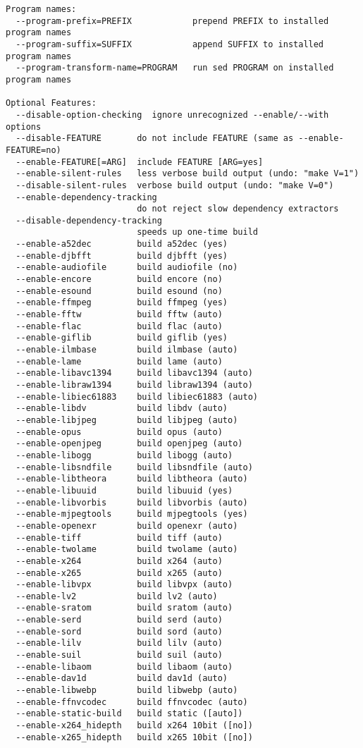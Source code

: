 \begin{verbatim}
Program names:
  --program-prefix=PREFIX            prepend PREFIX to installed program names
  --program-suffix=SUFFIX            append SUFFIX to installed program names
  --program-transform-name=PROGRAM   run sed PROGRAM on installed program names

Optional Features:
  --disable-option-checking  ignore unrecognized --enable/--with options
  --disable-FEATURE       do not include FEATURE (same as --enable-FEATURE=no)
  --enable-FEATURE[=ARG]  include FEATURE [ARG=yes]
  --enable-silent-rules   less verbose build output (undo: "make V=1")
  --disable-silent-rules  verbose build output (undo: "make V=0")
  --enable-dependency-tracking
                          do not reject slow dependency extractors
  --disable-dependency-tracking
                          speeds up one-time build
  --enable-a52dec         build a52dec (yes)
  --enable-djbfft         build djbfft (yes)
  --enable-audiofile      build audiofile (no)
  --enable-encore         build encore (no)
  --enable-esound         build esound (no)
  --enable-ffmpeg         build ffmpeg (yes)
  --enable-fftw           build fftw (auto)
  --enable-flac           build flac (auto)
  --enable-giflib         build giflib (yes)
  --enable-ilmbase        build ilmbase (auto)
  --enable-lame           build lame (auto)
  --enable-libavc1394     build libavc1394 (auto)
  --enable-libraw1394     build libraw1394 (auto)
  --enable-libiec61883    build libiec61883 (auto)
  --enable-libdv          build libdv (auto)
  --enable-libjpeg        build libjpeg (auto)
  --enable-opus           build opus (auto)
  --enable-openjpeg       build openjpeg (auto)
  --enable-libogg         build libogg (auto)
  --enable-libsndfile     build libsndfile (auto)
  --enable-libtheora      build libtheora (auto)
  --enable-libuuid        build libuuid (yes)
  --enable-libvorbis      build libvorbis (auto)
  --enable-mjpegtools     build mjpegtools (yes)
  --enable-openexr        build openexr (auto)
  --enable-tiff           build tiff (auto)
  --enable-twolame        build twolame (auto)
  --enable-x264           build x264 (auto)
  --enable-x265           build x265 (auto)
  --enable-libvpx         build libvpx (auto)
  --enable-lv2            build lv2 (auto)
  --enable-sratom         build sratom (auto)
  --enable-serd           build serd (auto)
  --enable-sord           build sord (auto)
  --enable-lilv           build lilv (auto)
  --enable-suil           build suil (auto)
  --enable-libaom         build libaom (auto)
  --enable-dav1d          build dav1d (auto)
  --enable-libwebp        build libwebp (auto)
  --enable-ffnvcodec      build ffnvcodec (auto)
  --enable-static-build   build static ([auto])
  --enable-x264_hidepth   build x264 10bit ([no])
  --enable-x265_hidepth   build x265 10bit ([no])


\end{verbatim}
